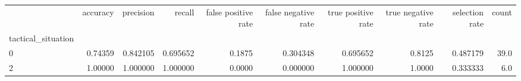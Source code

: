 \begin{tabular}{lrrrrrrrrr}
\toprule
{} &  accuracy &  precision &    recall &  false positive rate &  false negative rate &  true positive rate &  true negative rate &  selection rate &  count \\
tactical\_situation &           &            &           &                      &                      &                     &                     &                 &        \\
\midrule
0                  &   0.74359 &   0.842105 &  0.695652 &               0.1875 &             0.304348 &            0.695652 &              0.8125 &        0.487179 &   39.0 \\
2                  &   1.00000 &   1.000000 &  1.000000 &               0.0000 &             0.000000 &            1.000000 &              1.0000 &        0.333333 &    6.0 \\
\bottomrule
\end{tabular}
